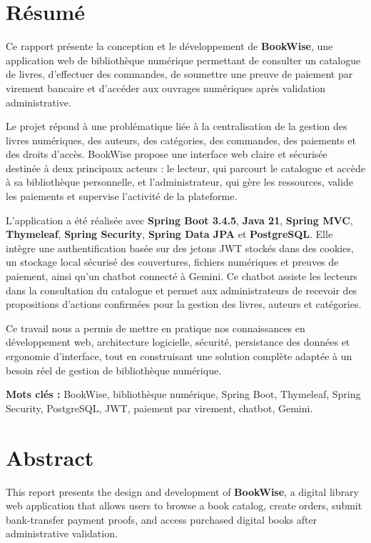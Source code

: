 \documentclass[12pt,a4paper]{report}
\begin{document}
\chapter*{Résumé}

Ce rapport présente la conception et le développement de \textbf{BookWise}, une application web de bibliothèque numérique permettant de consulter un catalogue de livres, d'effectuer des commandes, de soumettre une preuve de paiement par virement bancaire et d'accéder aux ouvrages numériques après validation administrative.

Le projet répond à une problématique liée à la centralisation de la gestion des livres numériques, des auteurs, des catégories, des commandes, des paiements et des droits d'accès. BookWise propose une interface web claire et sécurisée destinée à deux principaux acteurs : le lecteur, qui parcourt le catalogue et accède à sa bibliothèque personnelle, et l'administrateur, qui gère les ressources, valide les paiements et supervise l'activité de la plateforme.

L'application a été réalisée avec \textbf{Spring Boot 3.4.5}, \textbf{Java 21}, \textbf{Spring MVC}, \textbf{Thymeleaf}, \textbf{Spring Security}, \textbf{Spring Data JPA} et \textbf{PostgreSQL}. Elle intègre une authentification basée sur des jetons JWT stockés dans des cookies, un stockage local sécurisé des couvertures, fichiers numériques et preuves de paiement, ainsi qu'un chatbot connecté à Gemini. Ce chatbot assiste les lecteurs dans la consultation du catalogue et permet aux administrateurs de recevoir des propositions d'actions confirmées pour la gestion des livres, auteurs et catégories.

Ce travail nous a permis de mettre en pratique nos connaissances en développement web, architecture logicielle, sécurité, persistance des données et ergonomie d'interface, tout en construisant une solution complète adaptée à un besoin réel de gestion de bibliothèque numérique.

\textbf{Mots clés :} BookWise, bibliothèque numérique, Spring Boot, Thymeleaf, Spring Security, PostgreSQL, JWT, paiement par virement, chatbot, Gemini.

\chapter*{Abstract}

This report presents the design and development of \textbf{BookWise}, a digital library web application that allows users to browse a book catalog, create orders, submit bank-transfer payment proofs, and access purchased digital books after administrative validation.
\end{document}
